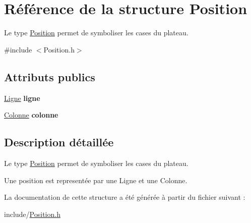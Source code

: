 \hypertarget{structPosition}{}\section{Référence de la structure Position}
\label{structPosition}


Le type \hyperlink{structPosition}{Position} permet de symboliser les cases du plateau.  




{\ttfamily \#include $<$Position.\+h$>$}

\subsection*{Attributs publics}
\begin{DoxyCompactItemize}
\item 
\mbox{\label{structPosition_aa0f9974c1f45c5384267258969f4f9b1}} 
\hyperlink{Ligne_8h_a5cdc09714e36ad7319234eab8fdf5e0b}{Ligne} {\bfseries ligne}
\item 
\mbox{\label{structPosition_af2e819310ebcffd34ae6f59cc7b33297}} 
\hyperlink{Colonne_8h_aae4471c444022e1a2ce4e2af6c2d4419}{Colonne} {\bfseries colonne}
\end{DoxyCompactItemize}


\subsection{Description détaillée}
Le type \hyperlink{structPosition}{Position} permet de symboliser les cases du plateau. 

Une position est representée par une Ligne et une Colonne. 

La documentation de cette structure a été générée à partir du fichier suivant \+:\begin{DoxyCompactItemize}
\item 
include/\hyperlink{Position_8h}{Position.\+h}\end{DoxyCompactItemize}

